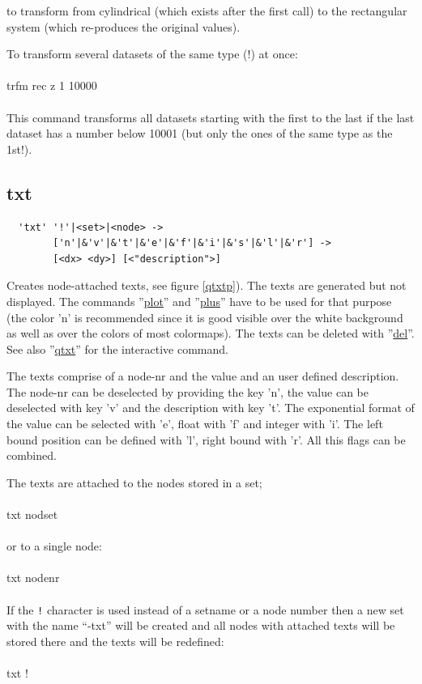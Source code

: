 \documentclass{article}
\providecommand{\htmlref}[2]{\hyperref[#2]{#1}}
\begin{document}
to transform from cylindrical (which exists after the first call) to 
the rectangular system (which re-produces the original values).

To transform several datasets of the same type (!) at once:\\\\

trfm rec z 1 10000\\\\

This command transforms all datasets starting with the first to the last if the 
last dataset has a number below 10001 (but only the ones of the same type as 
the 1st!).

\subsection{\label{txt}txt}
\begin{verbatim}
  'txt' '!'|<set>|<node> ->
        ['n'|&'v'|&'t'|&'e'|&'f'|&'i'|&'s'|&'l'|&'r'] ->
        [<dx> <dy>] [<"description">]
\end{verbatim}
Creates node-attached texts, see figure \ref{qtxtp}). The texts are generated but not displayed. The commands ''\htmlref{plot}{plot}'' and ''\htmlref{plus}{plus}'' have to be used for that purpose (the color 'n' is recommended since it is good visible over the white background as well as over the colors of most colormaps). The texts can be deleted with ''\htmlref{del}{del}''. See also ''\htmlref{qtxt}{qtxt}'' for the interactive command.

The texts comprise of a node-nr and the value and an user defined description. The node-nr can be deselected by providing the key 'n', the value can be deselected with key 'v' and the description with key 't'. The exponential format of the value can be selected with 'e', float with 'f' and integer with 'i'. The left bound position can be defined with 'l', right bound with 'r'. All this flags can be combined.

The texts are attached to the nodes stored in a set;\\\\txt nodset\\\\or to a single node:\\\\txt nodenr\\\\If the \verb_!_ character is used instead of a setname or a node number then a new set with the name ``-txt'' will be created and all nodes with attached texts will be stored there and the texts will be redefined:\\\\txt !\\\\
\end{document}
